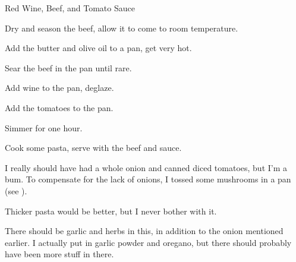 \documentclass{recipe}
\begin{document}
\begin{recipe}{Red Wine, Beef, and Tomato Sauce}

  \begin{ingredients}
  \end{ingredients}

  \begin{steps}
  \item Dry and season the beef, allow it to come to room temperature.
  \item Add the butter and olive oil to a pan, get very hot.
  \item Sear the beef in the pan until rare.
  \item Add wine to the pan, deglaze.
  \item Add the tomatoes to the pan.
  \item Simmer for one hour.
  \item Cook some pasta, serve with the beef and sauce.
  \end{steps}

  \begin{notes}
  \item I really should have had a whole onion and canned diced
    tomatoes, but I'm a bum.  To compensate for the lack of onions, I
    tossed some mushrooms in a pan (see ).
  \item Thicker pasta would be better, but I never bother with it.
  \item There should be garlic and herbs in this, in addition to the
    onion mentioned earlier.  I actually put in garlic powder and
    oregano, but there should probably have been more stuff in there.
  \end{notes}
\end{recipe}
\end{document}
